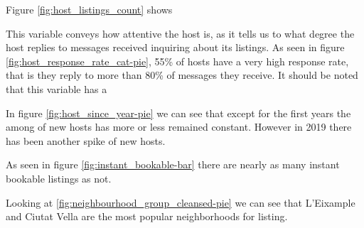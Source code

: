\begin{comment}
\Cref{fig:host_identity_verified-pie} shows that only 74\% of hosts have
had their identity verified by \airbnb, meaning that the other 25\% isn't.
This can be expected since the verification process can be complicated in some
cases, even requiring the host to provide an official document or additional
pictures of himself.

\figf{host_is_superhost}{host is superhost}

As seen in figure \ref{fig:host_is_superhost-pie}, only the 19\% of hosts are superhosts. 
This may be the case because the conditions to achieve this status are rather hard.

\end{comment}


Figure \ref{fig:host_listings_count} shows 



This variable conveys how attentive the host is, as it tells us to what degree
the host replies to messages received inquiring about its listings. As seen
in figure \ref{fig:host_response_rate_cat-pie}, 55\% of hosts have a very high
response rate, that is they reply to more than 80\% of messages they receive.
It should be noted that this variable has a 


In figure \ref{fig:host_since_year-pie} we can see that except for the first years the among of new hosts has more or less remained constant. However 
in 2019 there has been another spike of new hosts.



As seen in figure \ref{fig:instant_bookable-bar} there are nearly as many instant bookable listings as not.



Looking at \ref{fig:neighbourhood_group_cleansed-pie} we can see that L'Eixample
and Ciutat Vella are the most popular neighborhoods for listing.


